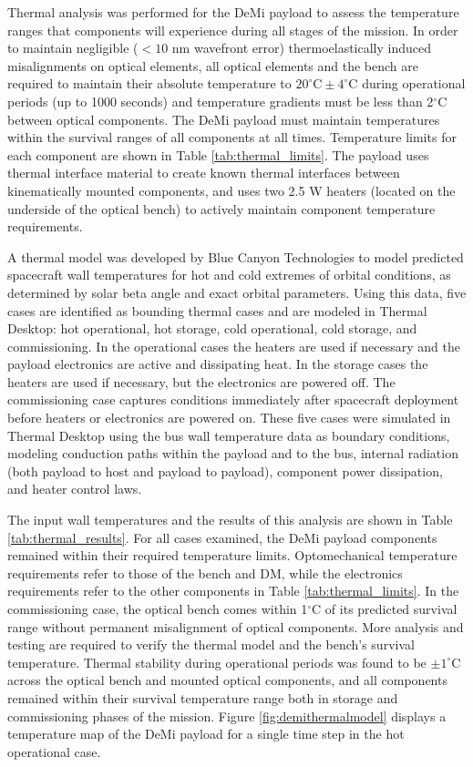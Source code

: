 \documentclass[]{spie}  %
\begin{document}
Thermal analysis was performed for the DeMi payload to assess the temperature ranges that components will experience during all stages of the mission. In order to maintain negligible ($<10 $ nm wavefront error) thermoelastically induced misalignments on optical elements, all optical elements and the bench are required to maintain their absolute temperature to $20^{\circ}\text{C}\pm4^{\circ}\text{C}$ during operational periods (up to 1000 seconds) and temperature gradients must be less than 2$^\circ$C between optical components.
 The DeMi payload must maintain temperatures within the survival ranges of all components at all times. Temperature limits for each component are shown in Table \ref{tab:thermal_limits}. The  payload uses thermal interface material to create known thermal interfaces between kinematically mounted components, and uses two  2.5 W heaters (located on the underside of the optical bench) to actively maintain component temperature requirements.

A thermal model was developed by Blue Canyon Technologies to model predicted spacecraft wall temperatures for hot and cold extremes of orbital conditions, as determined by solar beta angle and exact orbital parameters. Using this data, five cases are identified as bounding thermal cases and are modeled in Thermal Desktop: hot operational, hot storage, cold operational, cold storage, and commissioning. In the operational cases the heaters are used if necessary and the payload electronics are active and dissipating heat. In the storage cases the heaters are used if necessary, but the electronics are powered off. The commissioning case captures conditions immediately after spacecraft deployment before heaters or electronics are powered on.  
These five cases were simulated in Thermal Desktop using the bus wall temperature data as boundary conditions, modeling conduction paths within the payload and to the bus, internal radiation (both payload to host and payload to payload), component power dissipation, and heater control laws. 

The input wall temperatures and the results of this analysis are shown in Table \ref{tab:thermal_results}. For all cases examined, the DeMi payload components remained within their required temperature limits. Optomechanical temperature requirements refer to those of the bench and DM, while the electronics requirements refer to the other components in Table \ref{tab:thermal_limits}. In the commissioning case, the optical bench comes within 1$^\circ$C of its predicted survival range without permanent misalignment of optical components. More analysis and testing are required to verify the thermal model and the bench's survival temperature. Thermal stability during operational periods was found to be $\pm 1^{\circ}$C across the optical bench and mounted optical components, and all components remained within their survival temperature range both in storage and commissioning phases of the mission. Figure \ref{fig:demithermalmodel} displays a temperature map of the DeMi payload for a single time step in the hot operational case. 
\end{document}
